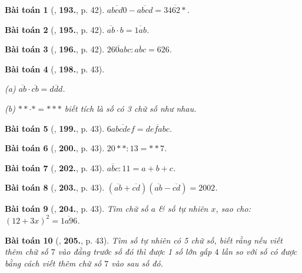 \documentclass{article}
\numberwithin{equation}{section}
\newtheorem{baitoan}{Bài toán}[section]
\begin{document}
\begin{baitoan}[\cite{Binh_Toan_6_tap_1}, \textbf{193.}, p. 42]
	$\overline{abcd0} - \overline{abcd} = \overline{3462*}$.
\end{baitoan}

\begin{baitoan}[\cite{Binh_Toan_6_tap_1}, \textbf{195.}, p. 42]
	$\overline{ab}\cdot b = \overline{1ab}$.
\end{baitoan}

\begin{baitoan}[\cite{Binh_Toan_6_tap_1}, \textbf{196.}, p. 42]
	$\overline{260abc}:\overline{abc} = 626$.
\end{baitoan}

\begin{baitoan}[\cite{Binh_Toan_6_tap_1}, \textbf{198.}, p. 43]
	\begin{enumerate*}
		\item[(a)] $\overline{ab}\cdot\overline{cb} = \overline{ddd}$.
		\item[(b)] $**\cdot* = ***$ biết tích là số có 3 chữ số như nhau.
	\end{enumerate*}
\end{baitoan}

\begin{baitoan}[\cite{Binh_Toan_6_tap_1}, \textbf{199.}, p. 43]
	$6\overline{abcdef} = \overline{defabc}$.
\end{baitoan}

\begin{baitoan}[\cite{Binh_Toan_6_tap_1}, \textbf{200.}, p. 43]
	$20**:13 = **7$.
\end{baitoan}

\begin{baitoan}[\cite{Binh_Toan_6_tap_1}, \textbf{202.}, p. 43]
	$\overline{abc}:11 = a + b + c$.
\end{baitoan}

\begin{baitoan}[\cite{Binh_Toan_6_tap_1}, \textbf{203.}, p. 43]
	$(\overline{ab} + \overline{cd})(\overline{ab} - \overline{cd}) = 2002$.
\end{baitoan}

\begin{baitoan}[\cite{Binh_Toan_6_tap_1}, \textbf{204.}, p. 43]
	Tìm chữ số $a$ \& số tự nhiên $x$, sao cho: $(12 + 3x)^2 = \overline{1a96}$.
\end{baitoan}

\begin{baitoan}[\cite{Binh_Toan_6_tap_1}, \textbf{205.}, p. 43]
	Tìm số tự nhiên có 5 chữ số, biết rằng nếu viết thêm chữ số $7$ vào đằng trước số đó thì được 1 số lớn gấp $4$ lần so với số có được bằng cách viết thêm chữ số $7$ vào sau số đó.
\end{baitoan}
\end{document}
